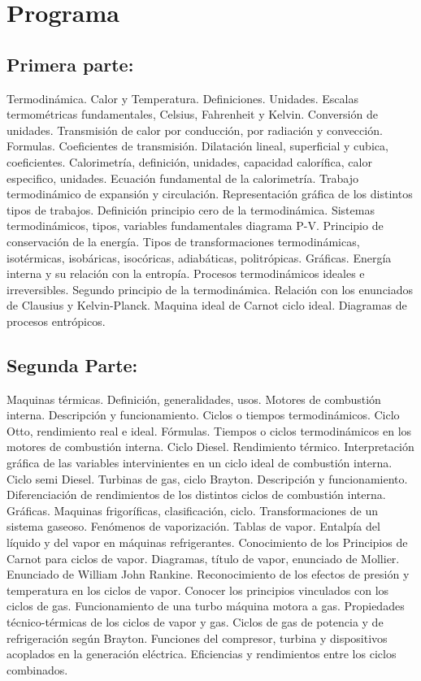 \documentclass[../main]{subfiles}
\begin{document}
\section*{Programa}

\subsection*{Primera parte:}    Termodinámica. Calor y Temperatura.
Definiciones. Unidades. Escalas termométricas fundamentales, Celsius,
Fahrenheit y Kelvin. Conversión de unidades. Transmisión de calor por
conducción, por radiación y convección. Formulas. Coeficientes de transmisión.
Dilatación lineal, superficial y cubica, coeficientes. Calorimetría,
definición, unidades, capacidad calorífica, calor especifico,
unidades. Ecuación fundamental de la calorimetría. Trabajo
termodinámico de expansión y circulación. Representación gráfica de
los distintos tipos de trabajos. Definición principio cero de la
termodinámica. Sistemas termodinámicos,  tipos, variables
fundamentales diagrama P-V. Principio de conservación de la energía.
Tipos de transformaciones termodinámicas, isotérmicas, isobáricas,
isocóricas, adiabáticas, politrópicas. Gráficas. Energía interna y su
relación con la entropía. Procesos termodinámicos ideales e
irreversibles. Segundo principio de la termodinámica. Relación con
los enunciados de  Clausius y Kelvin-Planck. Maquina ideal de Carnot
ciclo ideal. Diagramas de procesos entrópicos.
\subsection*{Segunda Parte:}  Maquinas térmicas. Definición,
generalidades, usos. Motores de combustión interna. Descripción y
funcionamiento.  Ciclos o tiempos termodinámicos. Ciclo Otto,
rendimiento real e ideal. Fórmulas. Tiempos o ciclos termodinámicos
en los motores de combustión interna. Ciclo Diesel. Rendimiento
térmico. Interpretación gráfica de las variables intervinientes en un
ciclo ideal de combustión interna. Ciclo semi Diesel. Turbinas de
gas, ciclo Brayton. Descripción y funcionamiento.    Diferenciación
de rendimientos de los distintos ciclos de combustión interna.
Gráficas. Maquinas frigoríficas, clasificación, ciclo.
Transformaciones de un sistema gaseoso. Fenómenos de vaporización.
Tablas de vapor. Entalpía del líquido y del vapor en máquinas
refrigerantes. Conocimiento de los Principios de Carnot para ciclos
de vapor. Diagramas, título de vapor,  enunciado de Mollier.
Enunciado de William John Rankine. Reconocimiento de los efectos de
presión y temperatura en los ciclos de vapor. Conocer los principios
vinculados con los ciclos de gas. Funcionamiento de una turbo máquina
motora a gas. Propiedades técnico-térmicas de los ciclos de vapor y
gas. Ciclos de gas de potencia y de refrigeración según Brayton.
Funciones del compresor, turbina y dispositivos acoplados en la
generación eléctrica. Eficiencias y rendimientos entre los ciclos combinados.
\end{document}
